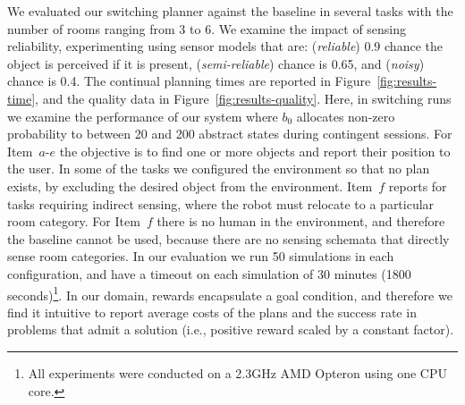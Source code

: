 \documentclass{article}
\begin{document}
We evaluated our switching planner against the baseline in several
tasks with the number of rooms ranging from 3 to 6. We examine the
impact of sensing reliability, experimenting using sensor models that
are: ({\em reliable}) $0.9$ chance the object is perceived if it is
present, ({\em semi-reliable}) chance is 0.65, and ({\em noisy})
chance is 0.4. The continual planning times are reported in
Figure~\ref{fig:results-time}, and the quality data in
Figure~\ref{fig:results-quality}. Here, in switching runs we examine
the performance of our system where $b_0$ allocates non-zero
probability to between 20 and 200 abstract states during contingent
sessions. For Item~$a$-$e$ the objective is to find one or more
objects and report their position to the user. In some of the tasks we
configured the environment so that no plan exists, by excluding the
desired object from the environment. Item~$f$ reports for tasks
requiring indirect sensing, where the robot must relocate to a
particular room category. For Item~$f$ there is no human in the
environment, and therefore the baseline cannot be used, because there
are no sensing schemata that directly sense room categories. In our
evaluation we run 50 simulations in each configuration, and have a
timeout on each simulation of 30 minutes (1800 seconds)\footnote{All
  experiments were conducted on a 2.3GHz AMD Opteron using one CPU
  core.}. In our domain, rewards encapsulate a goal condition, and
therefore we find it intuitive to report average costs of the plans
and the success rate in problems that admit a solution (i.e., positive
reward scaled by a constant factor).


\end{document}
